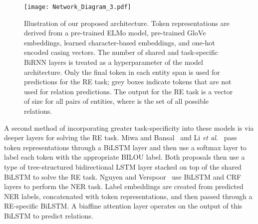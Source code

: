 \documentclass{article}
\begin{document}
\begin{figure*}
    \centering
    \texttt{[image: Network\_Diagram\_3.pdf]}
    \caption{Illustration of our proposed architecture. Token representations are derived from a pre-trained ELMo model, pre-trained GloVe embeddings, learned character-based embeddings, and one-hot encoded casing vectors. The number of shared and task-specific BiRNN layers is treated as a hyperparameter of the model architecture. Only the final token in each entity span is used for predictions for the RE task; grey boxes indicate tokens that are not used for relation predictions. The output for the RE task is a vector of size  for all pairs of entities, where  is the set of all possible relations.}
    \label{fig:architecture}
\end{figure*}

A second method of incorporating greater task-specificity into these models is via deeper layers for solving the RE task. Miwa and Bansal~ and Li {\em et al.}~ pass token representations through a BiLSTM layer and then use a softmax layer to label each token with the appropriate BILOU label. Both proposals then use a type of tree-structured bidirectional LSTM layer stacked on top of the shared BiLSTM to solve the RE task. Nguyen and Verspoor~ use BiLSTM and CRF layers to perform the NER task. Label embeddings are created from predicted NER labels, concatenated with token representations, and then passed through a RE-specific BiLSTM. A biaffine attention layer \cite{dozat2016deep} operates on the output of this BiLSTM to predict relations.
\end{document}
